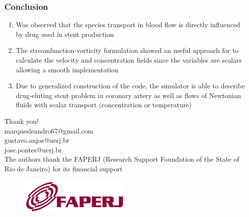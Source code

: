 
\begin{frame}
 \frametitle{\Large Conclusion}
 \vspace{-1cm}
\begin{enumerate}
 \justifying
 \small
 \item Was observed that the species transport in blood flow is directly influenced
       by drug used in stent production\\

 \vspace{0.3cm}
 
 \item The streamfunction-vorticity formulation showed an useful approach for to calculate
       the velocity and concentration fields since the variables are scalars allowing a
       smooth implementation\\

 \vspace{0.3cm}

 \item Due to generalized construction of the code, the simulator is able to describe
       drug-eluting stent problem in coronary artery as well as flows of Newtonian fluids
       with scalar transport (concentration or temperature)
\end{enumerate}
\end{frame}



\begin{frame}
 \centering
 \vspace{-1cm}
 \Huge Thank you!\\
 \vspace{0.5cm}
 \small marquesleandro67@gmail.com\\
 \small gustavo.anjos@uerj.br\\
 \small jose.pontes@uerj.br\\
 \vspace{1.0cm}
 \small The authors thank the FAPERJ (Research Support Foundation of the State of Rio de Janeiro)
        for its financial support

 \vspace{-0.2cm}
 \begin{figure}
  \centering
  \includegraphics[scale=0.4]{images/faperj.jpg}\\
 \end{figure}
\end{frame}





